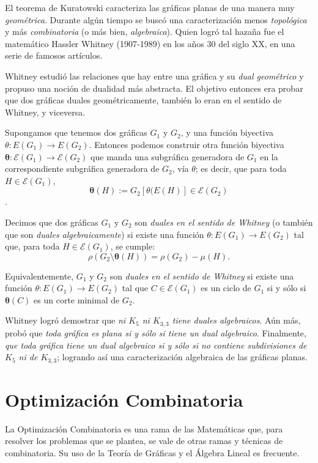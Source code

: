 El teorema de Kuratowski caracteriza las gráficas planas de una manera muy \textit{geométrica}. Durante algún tiempo se buscó una caracterización menos \textit{topológica} y más \textit{combinatoria} (o más bien, \textit{algebraica}). Quien logró tal hazaña fue el matemático Hassler Whitney (1907-1989) en los años $30$ del siglo XX, en una serie de famosos artículos.

Whitney estudió las relaciones que hay entre una gráfica y su \textit{dual geométrico} y propuso una noción de dualidad más abstracta. El objetivo entonces era probar que dos gráficas duales geométricamente, también lo eran en el sentido de Whitney, y viceversa.

Supongamos que tenemos dos gráficas $G_{1}$ y $G_{2}$, y una función biyectiva $\theta \colon E(G_{1}) \rightarrow E(G_{2})$. Entonces podemos construir otra función biyectiva $\boldsymbol{\theta} \colon \mathcal{E}(G_{1}) \rightarrow \mathcal{E}(G_{2})$ que manda una subgráfica generadora de $G_{1}$ en la correspondiente subgráfica generadora de $G_{2}$, vía $\theta$; es decir, que para toda $H \in \mathcal{E}(G_{1})$, $$\boldsymbol{\theta}(H):= G_{2}[\theta(E(H)] \in \mathcal{E}(G_{2})$$.

Decimos que dos gráficas $G_{1}$ y $G_{2}$ son \textit{duales en el sentido de Whitney} (o también que son \textit{duales algebraicamente}) si existe una función $\theta \colon E(G_{1}) \rightarrow E(G_{2})$ tal que, para toda $H\in \mathcal{E}(G_{1})$, se cumple:
$$\rho(G_{2} \setminus \boldsymbol{\theta}(H)) = \rho(G_{2}) - \mu(H).$$

Equivalentemente, $G_{1}$ y $G_{2}$ son \textit{duales en el sentido de Whitney} si existe una función $\theta \colon E(G_{1}) \rightarrow E(G_{2})$ tal que $C \in \mathcal{E}(G_{1})$ es un ciclo de $G_{1}$ si y sólo si $\boldsymbol{\theta}(C)$ es un corte minimal de $G_{2}$.

Whitney logró demostrar que \textit{ni $K_{5}$ ni  $K_{3,3}$ tiene duales algebraicos}. Aún más, probó que \textit{toda gráfica es plana si y sólo si tiene un dual algebraico}. Finalmente, \textit{que toda gráfica tiene un dual algebraico si y sólo si no contiene subdivisiones de $K_{5}$ ni de $K_{3,3}$}; logrando así una caracterización algebraica de las gráficas planas.

\section{Optimización Combinatoria}
La Optimización Combinatoria es una rama de las Matemáticas que, para resolver los problemas que se plantea, se vale de otras ramas y técnicas de combinatoria. Su uso de la Teoría de Gráficas y el Álgebra Lineal es frecuente.


